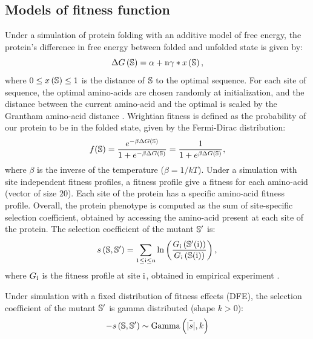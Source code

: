 \documentclass{MBE}%
\begin{document}
\subsection*{Models of fitness function}
\label{MatMet:folding}

Under a simulation of protein folding with an additive model of free energy, the protein's difference in free energy between folded and unfolded state is given by:
\begin{equation*}
\Delta G\left(\mathbb{S}\right) = \alpha + \text{n} \gamma * x\left(\mathbb{S}\right), 
\end{equation*}
where $0 \leq x\left(\mathbb{S}\right) \leq 1$ is the distance of $\mathbb{S}$ to the optimal sequence.
For each site of sequence, the optimal amino-acids are chosen randomly at initialization, and the distance between the current amino-acid and the optimal is scaled by the Grantham amino-acid distance \citep{Grantham1974}.
Wrightian fitness is defined as the probability of our protein to be in the folded state, given by the Fermi-Dirac distribution: 
\begin{equation}
f(\mathbb{S}) = \dfrac{e^{-\beta \Delta G\left(\mathbb{S}\right) }}{1 + e^{-\beta \Delta G\left(\mathbb{S}\right) }} = \dfrac{1}{1 + e^{\beta \Delta G\left(\mathbb{S}\right) }}, 
\end{equation}
where $\beta$ is the inverse of the temperature ($\beta=1/kT$).
Under a simulation with site independent fitness profiles, a fitness profile give a fitness for each amino-acid (vector of size $20$).
Each site of the protein has a specific amino-acid fitness profile.
Overall, the protein phenotype is computed as the sum of site-specific selection coefficient, obtained by accessing the amino-acid present at each site of the protein.
The selection coefficient of the mutant $\mathbb{S}'$ is:
\begin{equation}
s \left( \mathbb{S},\mathbb{S}'\right) = \sum_{1 \leq \text{i} \leq \text{n}} \ln \left( \dfrac{G_{\text{i}} \left(\mathbb{S}'(\text{i}) \right)}{G_{\text{i}} \left(\mathbb{S}(\text{i}) \right)} \right) ,
\end{equation}
where $G_{\text{i}}$ is the fitness profile at site $\text{i}$, obtained in empirical experiment \citep{Bloom2017}.

Under simulation with a fixed distribution of fitness effects (DFE), the selection coefficient of the mutant $\mathbb{S}'$ is gamma distributed (shape $k > 0$):
\begin{equation}
- s \left( \mathbb{S},\mathbb{S}'\right) \sim \text{Gamma} \left( \bar{|s|}, k \right)
\end{equation}
\end{document}

